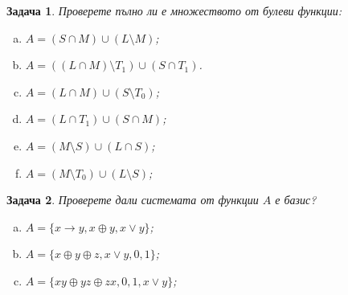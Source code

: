 \documentclass[a4paper]{article}
\newtheorem{problem}{Задача}
\begin{document}
\begin{problem} %
  Проверете пълно ли е множеството от булеви функции:
  \begin{enumerate}[a)]
  \item
    $A = (S\cap M)\cup(L\setminus M)$;
  \item
    $A = ((L\cap M)\setminus T_1)\cup (S\cap T_1)$.
  \item
    $A = (L\cap M)\cup (S\setminus T_0)$;
  \item
    $A = (L\cap T_1)\cup (S\cap M)$;
  \item
    $A = (M\setminus S)\cup(L\cap S)$;
  \item
    $A = (M\setminus T_0)\cup (L\setminus S)$;
  \end{enumerate}
\end{problem}

\begin{problem}
  Проверете дали системата от функции $A$ е базис?
  \begin{enumerate}[a)]
  \item
    $A = \{x\rightarrow y, x\oplus y, x\vee y\}$;
  \item
    $A = \{x\oplus y\oplus z, x\vee y, 0, 1\}$;
  \item
    $A = \{xy\oplus yz\oplus zx, 0, 1, x\vee y\}$;
  \end{enumerate}
\end{problem}
\end{document}

